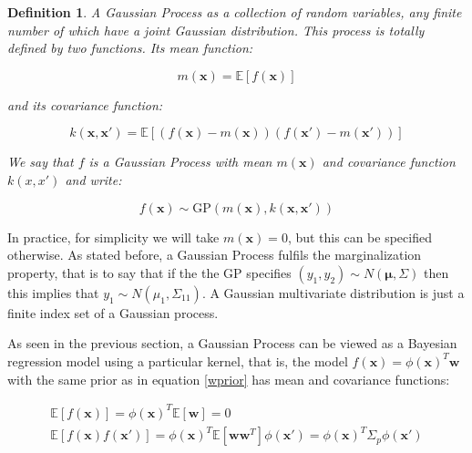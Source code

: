 \documentclass[10pt,a4paper,twoside]{book}
\newtheorem{defini}{Definition}
\begin{document}
\begin{defini}
A Gaussian Process as a collection of random variables, any finite number of which have a joint Gaussian distribution. This process is totally defined by two functions. Its \textit{mean function}:

\begin{equation}
m(\boldsymbol{x}) = \mathbb{E}\left[f(\boldsymbol{x})\right]
\end{equation} 

and its \textit{covariance function}:

\begin{equation}
k(\boldsymbol{x}, \boldsymbol{x'}) = \mathbb{E}\left[\left( f(\boldsymbol{x}) - m(\boldsymbol{x}) \right)\left( f(\boldsymbol{x}') - m(\boldsymbol{x}')\right)\right]
\end{equation}


We say that $f$ is a Gaussian Process with mean $m(\boldsymbol{x})$ and covariance function $k(x, x')$ and write:

\begin{equation}
f(\boldsymbol{x}) \sim \mathrm{GP}\left(m(\boldsymbol{x}), k(\boldsymbol{x}, \boldsymbol{x'}) \right)
\end{equation}
\end{defini}

In practice, for simplicity we will take $m(\boldsymbol{x}) = 0$, but this can be specified otherwise. As stated before, a Gaussian Process fulfils the marginalization property, that is to say that if the the GP specifies $(y_1, y_2) \sim N(\boldsymbol{\mu}, \Sigma)$ then this implies that $y_1 \sim N(\mu_1, \Sigma_{11})$. A Gaussian multivariate distribution is just a finite index set of a Gaussian process. 

As seen in the previous section, a Gaussian Process can be viewed as a Bayesian regression model using a particular kernel, that is, the model $f(\boldsymbol{x}) = \phi(\boldsymbol{x})^T \boldsymbol{w}$ with the same prior as in equation \ref{wprior} has mean and covariance functions:

\begin{align}
\mathbb{E}\left[f(\boldsymbol{x})\right] = \phi(\boldsymbol{x})^T\mathbb{E}\left[\boldsymbol{w}\right] = 0\\
\mathbb{E}\left[f(\boldsymbol{x})f(\boldsymbol{x'})\right] = \phi(\boldsymbol{x})^T\mathbb{E}\left[\boldsymbol{w}\boldsymbol{w}^T\right]
\phi(\boldsymbol{x'}) = \phi(\boldsymbol{x})^T\Sigma_p\phi(\boldsymbol{x'})
\end{align}
\end{document}
